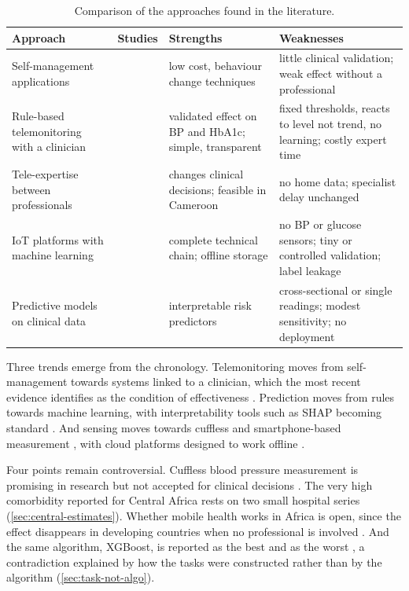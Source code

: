 \begin{table}[htbp]
\centering\footnotesize
\caption{Comparison of the approaches found in the literature.}\label{tab:approaches}
\begin{tabularx}{\textwidth}{@{}>{\raggedright\arraybackslash}p{2.6cm} >{\raggedright\arraybackslash}p{2.6cm} >{\raggedright\arraybackslash}X >{\raggedright\arraybackslash}X@{}}
\toprule
\textbf{Approach} & \textbf{Studies} & \textbf{Strengths} & \textbf{Weaknesses} \\
\midrule
Self-management applications & \textcite{alessa2019,zhou2024} & low cost, behaviour change techniques & little clinical validation; weak effect without a professional \\
Rule-based telemonitoring with a clinician & \textcite{kingue2013,mihevc2025} & validated effect on BP and HbA1c; simple, transparent & fixed thresholds, reacts to level not trend, no learning; costly expert time \\
Tele-expertise between professionals & \textcite{bediang2021} & changes clinical decisions; feasible in Cameroon & no home data; specialist delay unchanged \\
IoT platforms with machine learning & \textcite{tai2024,efendi2025,liu2025review} & complete technical chain; offline storage & no BP or glucose sensors; tiny or controlled validation; label leakage \\
Predictive models on clinical data & \textcite{chatrati2022,mendoza2025} & interpretable risk predictors & cross-sectional or single readings; modest sensitivity; no deployment \\
\bottomrule
\end{tabularx}
\end{table}

Three trends emerge from the chronology. Telemonitoring moves from self-management towards systems linked to a clinician, which the most recent evidence identifies as the condition of effectiveness \parencite{mao2020,bandeira2024,mihevc2025}. Prediction moves from rules towards machine learning, with interpretability tools such as SHAP becoming standard \parencite{mendoza2025,liu2025ppg}. And sensing moves towards cuffless and smartphone-based measurement \parencite{alhaddad2022,liu2025ppg}, with cloud platforms designed to work offline \parencite{efendi2025}.

Four points remain controversial. Cuffless blood pressure measurement is promising in research \parencite{liu2025ppg} but not accepted for clinical decisions \parencite{who2023hypertension}. The very high comorbidity reported for Central Africa rests on two small hospital series (\cref{sec:central-estimates}). Whether mobile health works in Africa is open, since the effect disappears in developing countries when no professional is involved \parencite{mao2020}. And the same algorithm, XGBoost, is reported as the best \parencite{efendi2025} and as the worst \parencite{mendoza2025}, a contradiction explained by how the tasks were constructed rather than by the algorithm (\cref{sec:task-not-algo}).

